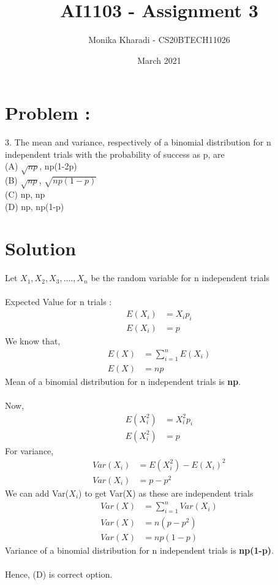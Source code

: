 \documentclass[journal,12pt,two column]{IEEEtran}
\title{AI1103 - Assignment 3}
\author{Monika Kharadi - CS20BTECH11026}
\date{March 2021}
\begin{document}
\maketitle
\section*{\large\textbf{Problem :}}
3. The mean and variance, respectively of a binomial distribution for n independent trials with the probability of success as p, are \\
(A) $\sqrt{np}$, np(1-2p)\\
(B) $\sqrt{np}$, $\sqrt{np(1-p)}$\\
(C) np, np \\
(D) np, np(1-p)
\section*{\large\textbf{Solution}}
Let $X_1,X_2,X_3,....,X_n$ be the random variable for n independent trials \\ \\
Expected Value for n trials : 
\begin{align}
E(X_i) &= X_i p_i \nonumber\\
E(X_i) &= p
\end{align}
We know that,
\begin{align}
E(X) &= \sum_{i=1}^n E (X_i) \nonumber\\
E(X) &= np
 \end{align}
Mean of a binomial distribution for n independent trials is \textbf{np}.\\ \\
Now,
\begin{align}
E(X_i^2) &= X_i^2 p_i \nonumber\\
E(X_i^2) &= p
\end{align}
For variance,
\begin{align}
    Var(X_i) &= E(X_i^2) - E(X_i)^2 \\
    Var(X_i) &= p - p^2 
    \end{align}
We can add Var($X_i$)  to get Var(X)  as these are independent trials
\begin{align}
Var(X) &= \sum_{i=1}^n Var(X_i) \nonumber \\
Var(X) &= n(p - p^2)\nonumber\\
Var(X) &= np(1-p)
\end{align}
Variance of a binomial distribution for n independent trials is \textbf{np(1-p)}.\\ \\
Hence, (D) is correct option.
\end{document}
